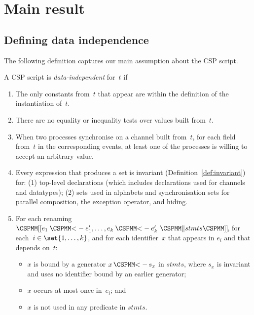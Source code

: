 \section{Main result}



\subsection{Defining data independence}

The following definition captures our main assumption about the CSP script.
%
\begin{definition}
\label{defn:data-independent}
A CSP script is \emph{data-independent} for~$t$ if
\begin{enumerate}
\item The only constants from~$t$ that appear are within the definition
  of the instantiation of~$t$.

\item There are no equality or inequality tests over values built from~$t$.

\item\label{item:sync} When two processes synchronise on a channel built
  from~$t$, for each field from~$t$ in the corresponding events, at least one
  of the processes is willing to accept an arbitrary value.

\item\label{item:di-invariant} Every expression that produces a set is
  invariant (Definition~\ref{def:invariant}) for: (1) top-level declarations
  (which includes declarations used for channels and datatypes); (2) sets used
  in alphabets and synchronisation sets for parallel composition, the
  exception operator, and hiding.

\item\label{item:di-renaming} For each renaming $\rename{e_1 \lArrow e_1',
  \ldots, e_k \lArrow e_k' ~ \M\| stmts}$, for each~$i \in \set{1,\ldots,k}$,
  and for each identifier~$x$ that appears in $e_i$ and that depends on~$t$:
%
  \begin{itemize}
  \item $x$ is bound by a generator $x \,\M{<-}\, s_x$ in $stmts$, where $s_x$
    is invariant and uses no identifier bound by an earlier generator;

  \item $x$ occurs at most once in~$e_i$; and

  \item $x$ is not used in any predicate in $stmts$.
  \end{itemize}


\end{enumerate}
\end{definition}
